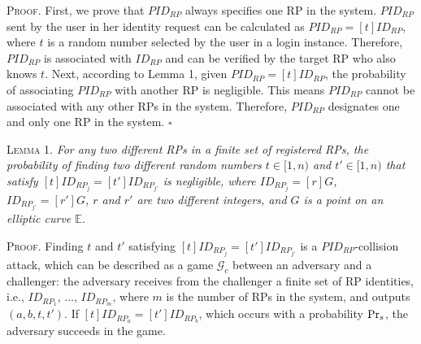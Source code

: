 \vspace{0.75mm}
\noindent\textsc{Proof.} First, we prove that $PID_{RP}$ always specifies one RP in the system. $PID_{RP}$ sent by the user in her identity request can be calculated as $PID_{RP} = [t]ID_{RP}$, where $t$ is a random number selected by the user in a login instance. Therefore, $PID_{RP}$ is associated with $ID_{RP}$ and can be verified by the target RP who also knows $t$. Next, according to Lemma 1, given $PID_{RP} = [t]ID_{RP}$, the probability of associating $PID_{RP}$ with another RP is negligible. This means $PID_{RP}$ cannot be associated with any other RPs in the system. Therefore, $PID_{RP}$ designates one and only one RP in the system.  \hfill $\square$

\vspace{1mm}
\noindent\textsc{Lemma 1.} {\em  For any two different RPs in a finite set of registered RPs, the probability of finding two different random numbers $t \in [1,n)$ and $t' \in [1,n)$ that satisfy $[t]ID_{RP_j} = [t']ID_{RP_{j'}}$ is negligible, where $ID_{RP_j}=[r]G$, $ID_{RP_{j'}}=[r']G$, $r$ and $r'$ are two different integers, and $G$ is a point on an elliptic curve $\mathbb{E}$.}


\oldc
\vspace{0.75mm}
\noindent\textsc{Proof.} Finding $t$ and $t'$ satisfying $[t]ID_{RP_j} = [t']ID_{RP_{j'}}$ is a $PID_{RP}$-collision attack, which can be described as a game $\mathcal{G}_c$ between an adversary and a challenger: the adversary receives from the challenger a finite set of RP identities, i.e., $ID_{RP_1}$, ..., $ID_{RP_m}$, where $m$ is the number of RPs in the system, and outputs $(a, b, t, t')$. If $[t]ID_{RP_a}=[t']ID_{RP_b}$, which occurs with a probability ${\rm Pr}_s$, the adversary succeeds in the game. %

